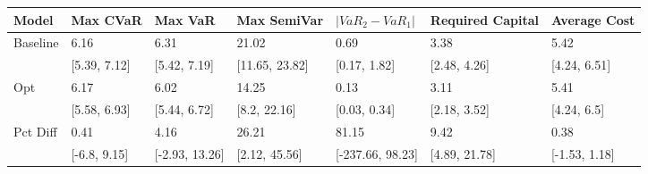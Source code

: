 \begin{tabular}{lllllll}
\toprule
   Model &     Max CVaR &        Max VaR &    Max SemiVar & $|VaR_2 - VaR_1|$ & Required Capital &  Average Cost \\
\midrule
Baseline &         6.16 &           6.31 &          21.02 &              0.69 &             3.38 &          5.42 \\
         & [5.39, 7.12] &   [5.42, 7.19] & [11.65, 23.82] &      [0.17, 1.82] &     [2.48, 4.26] &  [4.24, 6.51] \\
     Opt &         6.17 &           6.02 &          14.25 &              0.13 &             3.11 &          5.41 \\
         & [5.58, 6.93] &   [5.44, 6.72] &   [8.2, 22.16] &      [0.03, 0.34] &     [2.18, 3.52] &   [4.24, 6.5] \\
Pct Diff &         0.41 &           4.16 &          26.21 &             81.15 &             9.42 &          0.38 \\
         & [-6.8, 9.15] & [-2.93, 13.26] &  [2.12, 45.56] &  [-237.66, 98.23] &    [4.89, 21.78] & [-1.53, 1.18] \\
\bottomrule
\end{tabular}
